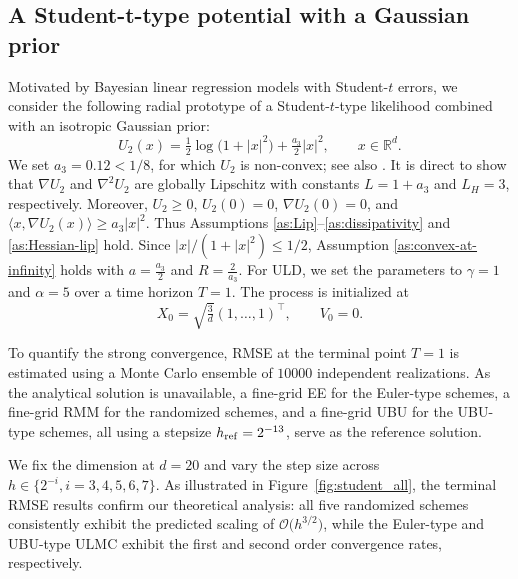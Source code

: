 \documentclass[12pt]{article}
\newenvironment{bluetext}
  {\color{black}\ignorespaces}
  {\ignorespacesafterend}
\numberwithin{equation}{section}
\begin{document}
\subsection{A Student-t-type potential with a Gaussian prior}

Motivated by Bayesian linear regression models with Student-$t$ errors, 
we consider the following radial prototype of a Student-$t$-type likelihood 
combined with an isotropic Gaussian prior:
$$U_2(x) = \tfrac{1}{2}\log\bigl(1+|x|^2\bigr) + \tfrac{a_3}{2}|x|^2, \qquad x\in\mathbb R^d.$$
%
\begin{bluetext}
We set $a_3=0.12<1/8$, for which $U_2$ is non-convex;
see also \cite[Section 4.2]{erdogdu2022convergence}.
It is direct to show that $\nabla U_2$ and
$\nabla^2 U_2$ are globally Lipschitz with
constants $L=1+a_3$ and $L_H=3$, respectively.
Moreover, $U_2\geq0$, $U_2(0)=0$, $\nabla U_2(0)=0$, and
$\langle x,\nabla U_2(x)\rangle\geq a_3|x|^2$.
Thus Assumptions \ref{as:Lip}--\ref{as:dissipativity}
and \ref{as:Hessian-lip} hold.
Since $|x|/(1+|x|^2)\leq1/2$, Assumption \ref{as:convex-at-infinity} holds with
$a=\frac{a_3}{2}$ and $R=\frac{2}{a_3}$.
\end{bluetext}
%
For ULD, we set the parameters to $\gamma=1$ and $\alpha=5$ over a time horizon $T=1$. The process is initialized at
$$X_0=\sqrt{\tfrac{3}{d}}(1,\ldots,1)^\top, \qquad V_0=0.$$

 To quantify the strong convergence, RMSE at the terminal point $T=1$ is estimated using a Monte Carlo ensemble of $10000$ independent realizations. As the analytical solution is unavailable, a fine-grid EE for the Euler-type schemes, a fine-grid RMM for the randomized schemes, and a fine-grid UBU for the UBU-type schemes, all using a stepsize $h_{\rm ref}=2^{-13}$, serve as the reference solution.

We fix the dimension at $d=20$ and vary the step size across $h \in \{2^{-i}, i=3,4,5,6,7\}$. As illustrated in Figure~\ref{fig:student_all}, the terminal RMSE results confirm our theoretical analysis: all five randomized schemes consistently exhibit the predicted scaling of $\mathcal O\bigl(h^{3/2}\bigr)$, while the Euler-type and UBU-type ULMC exhibit the first and second order convergence rates, respectively.
\end{document}
